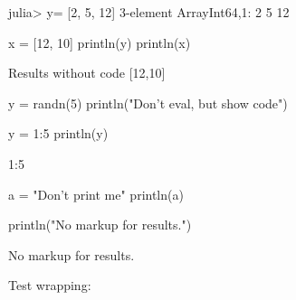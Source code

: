 

\begin{juliaterm}
julia> y= [2, 5, 12]
3-element Array{Int64,1}:
  2
  5
 12

\end{juliaterm}



\begin{juliacode}
x = [12, 10]
println(y)
println(x)
\end{juliacode}
\begin{juliaout}
[2,5,12]
[12,10]
\end{juliaout}




\begin{juliaout}
Results without code
[12,10]
\end{juliaout}




\begin{juliacode}
y = randn(5)
println("Don't eval, but show code")
\end{juliacode}



\begin{juliacode}
y = 1:5
println(y)
\end{juliacode}
\begin{juliaout}
1:5
\end{juliaout}



\begin{juliacode}
a = "Don't print me"
println(a)
\end{juliacode}



\begin{juliacode}
println("No markup for results.")
\end{juliacode}


No markup for results.




Test wrapping:

